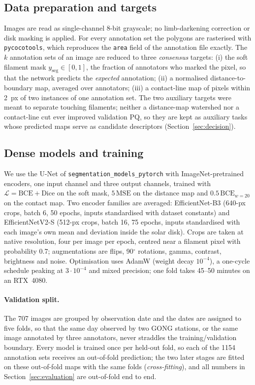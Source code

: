 \documentclass[sigconf]{acmart}
\begin{document}
\subsection{Data preparation and targets}
Images are read as single-channel 8-bit grayscale; no limb-darkening correction or disk masking is applied. For every annotation set the polygons are rasterised with \texttt{pycocotools}, which reproduces the \texttt{area} field of the annotation file exactly. The $k$ annotation sets of an image are reduced to three \emph{consensus} targets: (i) the soft filament mask $y_{\mathrm{seg}}\in[0,1]$, the fraction of annotators who marked the pixel, so that the network predicts the \emph{expected} annotation; (ii) a normalised distance-to-boundary map, averaged over annotators; (iii) a contact-line map of pixels within 2~px of two instances of one annotation set. The two auxiliary targets were meant to separate touching filaments; neither a distance-map watershed \cite{beucher1993watershed} nor a contact-line cut ever improved validation PQ, so they are kept as auxiliary tasks whose predicted maps serve as candidate descriptors (Section~\ref{sec:decision}).

\subsection{Dense models and training}
We use the U-Net of \texttt{segmentation\_models\_pytorch} \cite{iakubovskii2019smp} with ImageNet-pretrained encoders, one input channel and three output channels, trained with
$\mathcal{L}=\mathrm{BCE}+\mathrm{Dice}$ on the soft mask, $5\,\mathrm{MSE}$ on the distance map and $0.5\,\mathrm{BCE}_{w=20}$ on the contact map. Two encoder families are averaged: EfficientNet-B3 \cite{tan2019efficientnet} (640-px crops, batch 6, 50 epochs, inputs standardised with dataset constants) and EfficientNetV2-S \cite{tan2021efficientnetv2} (512-px crops, batch 16, 75 epochs, inputs standardised with each image's own mean and deviation inside the solar disk). Crops are taken at native resolution, four per image per epoch, centred near a filament pixel with probability 0.7; augmentations are flips, 90$^\circ$ rotations, gamma, contrast, brightness and noise. Optimisation uses AdamW (weight decay $10^{-4}$), a one-cycle schedule peaking at $3\cdot10^{-4}$ and mixed precision; one fold takes 45--50 minutes on an RTX~4080.

\paragraph{Validation split.} The 707 images are grouped by observation date and the dates are assigned to five folds, so that the same day observed by two GONG stations, or the same image annotated by three annotators, never straddles the training/validation boundary. Every model is trained once per held-out fold, so each of the 1154 annotation sets receives an out-of-fold prediction; the two later stages are fitted on these out-of-fold maps with the same folds (\emph{cross-fitting}), and all numbers in Section~\ref{sec:evaluation} are out-of-fold end to end.
\end{document}
